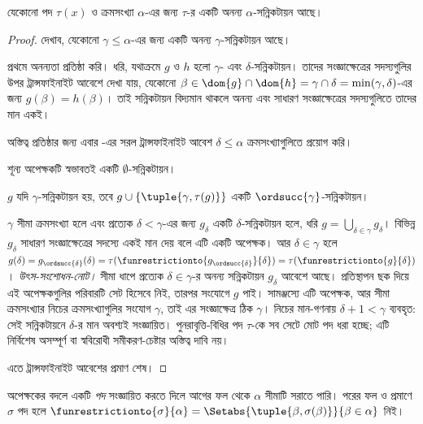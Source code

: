 \documentclass[../../../include/open-logic-section]{subfiles}
\begin{document}
\begin{lem}[সীমাবদ্ধ পুনরাবৃত্তি]
যেকোনো পদ $\tau(x)$ ও ক্রমসংখ্যা $\alpha$-এর
জন্য $\tau$-র একটি অনন্য $\alpha$-সন্নিকটায়ন
আছে।
\end{lem}
\begin{proof}
দেখাব, যেকোনো $\gamma \leq \alpha$-এর জন্য
একটি অনন্য $\gamma$-সন্নিকটায়ন আছে।

প্রথমে অনন্যতা প্রতিষ্ঠা করি। ধরি, যথাক্রমে
$g$ ও $h$ হলো $\gamma$- এবং
$\delta$-সন্নিকটায়ন। তাদের সংজ্ঞাক্ষেত্রের সদস্যগুলির উপর
ট্রান্সফাইনাইট আবেশে দেখা যায়,
যেকোনো $\beta \in \dom{g} \cap \dom{h} =
\gamma \cap \delta = \min(\gamma, \delta)$-এর
জন্য $g(\beta) = h(\beta)$। তাই সন্নিকটায়ন
বিদ্যমান থাকলে অনন্য এবং সাধারণ সংজ্ঞাক্ষেত্রের সদস্যগুলিতে
তাদের মান একই।

অস্তিত্ব প্রতিষ্ঠার জন্য এবার
-এর
সরল ট্রান্সফাইনাইট আবেশ $\delta \leq \alpha$
ক্রমসংখ্যাগুলিতে প্রয়োগ করি।

শূন্য অপেক্ষকটি স্বভাবতই একটি
$\emptyset$-সন্নিকটায়ন।

$g$ যদি $\gamma$-সন্নিকটায়ন হয়, তবে $g \cup
\{\tuple{\gamma, \tau(g)}\}$ একটি
$\ordsucc{\gamma}$-সন্নিকটায়ন।

$\gamma$ সীমা ক্রমসংখ্যা হলে এবং প্রত্যেক
$\delta < \gamma$-এর জন্য $g_\delta$ একটি
$\delta$-সন্নিকটায়ন হলে, ধরি
$g = \bigcup_{\delta \in \gamma} g_\delta$।
বিভিন্ন $g_\delta$ সাধারণ সংজ্ঞাক্ষেত্রের সদস্যে একই মান দেয়
বলে এটি একটি অপেক্ষক। আর $\delta \in \gamma$
হলে $g(\delta) = g_{\ordsucc{\delta}}(\delta) =
\tau(\funrestrictionto{g_{\ordsucc{\delta}}}{\delta}) =
\tau(\funrestrictionto{g}{\delta})$।
\emph{উৎস-সংশোধন-নোট।} সীমা ধাপে প্রত্যেক $\delta\in\gamma$-র
অনন্য সন্নিকটায়ন $g_\delta$ আবেশে আছে। প্রতিস্থাপন ছক দিয়ে
এই অপেক্ষকগুলির পরিবারটি সেট হিসেবে নিই, তারপর সংযোগে $g$
পাই। সামঞ্জস্যে এটি অপেক্ষক, আর সীমা ক্রমসংখ্যার নিচের
ক্রমসংখ্যাগুলির সংযোগ $\gamma$, তাই এর সংজ্ঞাক্ষেত্র ঠিক
$\gamma$। নিচের মান-গণনায় $\delta+1<\gamma$ ব্যবহৃত:
সেই সন্নিকটায়নে $\delta$-র মান অবশ্যই সংজ্ঞায়িত।
পুনরাবৃত্তি-বিধির পদ $\tau$-কে সব সেটে মোট পদ ধরা হচ্ছে;
এটি নির্বিশেষ অসম্পূর্ণ বা স্ববিরোধী সমীকরণ-চেষ্টার অস্তিত্ব দাবি নয়।

এতে ট্রান্সফাইনাইট আবেশের প্রমাণ শেষ।
\end{proof}

অপেক্ষকের বদলে একটি \emph{পদ} সংজ্ঞায়িত করতে
দিলে আগের ফল থেকে $\alpha$ সীমাটি সরাতে
পারি। পরের ফল ও প্রমাণে $\sigma$ পদ হলে
$\funrestrictionto{\sigma}{\alpha} = \Setabs{\tuple{\beta,
\sigma(\beta)}}{\beta \in \alpha}$ নিই।
\end{document}
